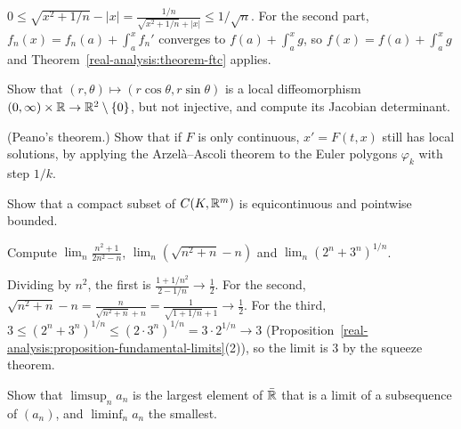 \begin{solution}
$0 \leq \sqrt{x^2 + 1/n} - |x| = \frac{1/n}{\sqrt{x^2 + 1/n} + |x|} \leq 1/\sqrt{n}$. For the second part, $f_n(x) = f_n(a) + \int_a^xf_n'$ converges to $f(a) + \int_a^xg$, so $f(x) = f(a) + \int_a^xg$ and
Theorem~\ref{real-analysis:theorem-ftc} applies.
\end{solution}

\begin{exercise}\label{real-analysis:exercise-polar}
Show that $(r, \theta) \mapsto (r\cos\theta, r\sin\theta)$ is a local diffeomorphism $(0, \infty) \times \mathbb{R} \to \mathbb{R}^2 \setminus \{0\}$, but not injective, and compute its Jacobian determinant.
\end{exercise}

\begin{exercise}\label{real-analysis:exercise-peano}
(Peano's theorem.) Show that if $F$ is only continuous, $x' = F(t, x)$ still has local solutions, by applying the Arzel\`a--Ascoli theorem to the Euler polygons $\varphi_k$ with
step $1/k$.
\end{exercise}

\begin{exercise}\label{real-analysis:exercise-arzela-converse}
Show that a compact subset of $C(K, \mathbb{R}^m)$ is equicontinuous and pointwise bounded.
\end{exercise}
\begin{exercise}\label{real-analysis:exercise-sequence-limits}
Compute $\lim_n\frac{n^2 + 1}{2n^2 - n}$, $\lim_n(\sqrt{n^2 + n} - n)$ and $\lim_n(2^n + 3^n)^{1/n}$.
\end{exercise}

\begin{solution}
Dividing by $n^2$, the first is $\frac{1 + 1/n^2}{2 - 1/n} \to \frac12$. For the second, $\sqrt{n^2 + n} - n = \frac{n}{\sqrt{n^2 + n} + n} = \frac{1}{\sqrt{1 + 1/n} + 1} \to \frac12$. For the third,
$3 \leq (2^n + 3^n)^{1/n} \leq (2 \cdot 3^n)^{1/n} = 3 \cdot 2^{1/n} \to 3$ (Proposition~\ref{real-analysis:proposition-fundamental-limits}(2)), so the limit is $3$ by the squeeze theorem.
\end{solution}

\begin{exercise}\label{real-analysis:exercise-limsup-subsequences}
Show that $\limsup_na_n$ is the largest element of $\bar{\mathbb{R}}$ that is a limit of a subsequence of $(a_n)$, and $\liminf_na_n$ the smallest.
\end{exercise}

